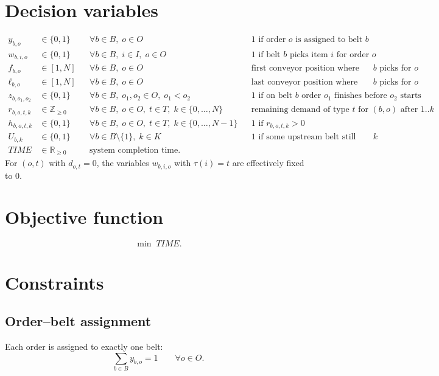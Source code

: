 \documentclass[11pt]{article}
\begin{document}
\section{Decision variables}
\begin{align*}
  y_{b,o} &\in \{0,1\} && \forall b \in B,\; o \in O
  && \text{1 if order $o$ is assigned to belt $b$} \\
  w_{b,i,o} &\in \{0,1\} && \forall b \in B,\; i \in I,\; o \in O
  && \text{1 if belt $b$ picks item $i$ for order $o$} \\
  f_{b,o} &\in [1,N] && \forall b \in B,\; o \in O
  && \text{first conveyor position where belt $b$ picks for $o$} \\
  \ell_{b,o} &\in [1,N] && \forall b \in B,\; o \in O
  && \text{last conveyor position where belt $b$ picks for $o$} \\
  z_{b,o_1,o_2} &\in \{0,1\} && \forall b \in B,\; o_1,o_2 \in O,\; o_1 < o_2
  && \text{1 if on belt $b$ order $o_1$ finishes before $o_2$ starts} \\
  r_{b,o,t,k} &\in \mathbb{Z}_{\ge 0} && \forall b \in B,\; o \in O,\; t \in T,\; k \in \{0,\ldots,N\}
  && \text{remaining demand of type $t$ for $(b,o)$ after $1..k$} \\
  h_{b,o,t,k} &\in \{0,1\} && \forall b \in B,\; o \in O,\; t \in T,\; k \in \{0,\ldots,N-1\}
  && \text{1 if $r_{b,o,t,k} > 0$} \\
  U_{b,k} &\in \{0,1\} && \forall b \in B \setminus \{1\},\; k \in K
  && \text{1 if some upstream belt still needs the type at $k$} \\
  TIME &\in \mathbb{R}_{\ge 0}
  && \text{system completion time.}
\end{align*}
For $(o,t)$ with $d_{o,t}=0$, the variables $w_{b,i,o}$ with $\tau(i)=t$ are effectively fixed to $0$.

\section{Objective function}
\begin{equation}
  \min \; TIME.
\end{equation}

\section{Constraints}

\subsection{Order--belt assignment}
Each order is assigned to exactly one belt:
\begin{equation}
  \sum_{b \in B} y_{b,o} = 1
  \qquad \forall o \in O.
\end{equation}
\end{document}
